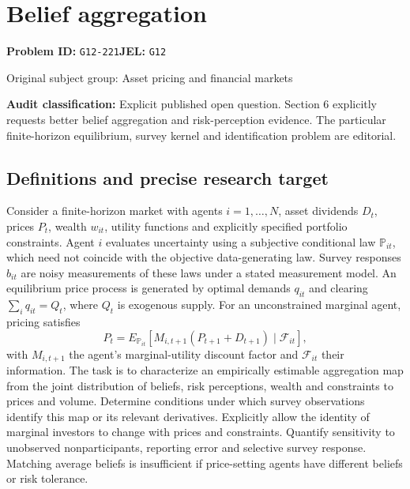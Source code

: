 \documentclass[11pt,a4paper]{article}
\begin{document}
\section*{Belief aggregation}
\textbf{Problem ID:} \texttt{G12-221}\quad \textbf{JEL:} \texttt{G12}\par
\label{problem:OP-0313}
{\sffamily\small\color{muted}Original subject group: Asset pricing and financial markets\par}
\label{definitions:problem:30007595}
\textbf{Audit classification:} Explicit published open question. Section 6 explicitly requests better belief aggregation and risk-perception evidence. The particular finite-horizon equilibrium, survey kernel and identification problem are editorial.
\subsection*{Definitions and precise research target}
Consider a finite-horizon market with agents \(i=1,\ldots,N\), asset dividends \(D_t\), prices \(P_t\), wealth \(w_{it}\), utility functions and explicitly specified portfolio constraints. Agent \(i\) evaluates uncertainty using a subjective conditional law \(\mathbb P_{it}\), which need not coincide with the objective data-generating law. Survey responses \(b_{it}\) are noisy measurements of these laws under a stated measurement model. An equilibrium price process is generated by optimal demands \(q_{it}\) and clearing \(\sum_iq_{it}=Q_t\), where \(Q_t\) is exogenous supply. For an unconstrained marginal agent, pricing satisfies
\[P_t=E_{\mathbb P_{it}}[M_{i,t+1}(P_{t+1}+D_{t+1})\mid\mathcal F_{it}],\]
with \(M_{i,t+1}\) the agent's marginal-utility discount factor and \(\mathcal F_{it}\) their information. The task is to characterize an empirically estimable aggregation map from the joint distribution of beliefs, risk perceptions, wealth and constraints to prices and volume. Determine conditions under which survey observations identify this map or its relevant derivatives. Explicitly allow the identity of marginal investors to change with prices and constraints. Quantify sensitivity to unobserved nonparticipants, reporting error and selective survey response. Matching average beliefs is insufficient if price-setting agents have different beliefs or risk tolerance.
\end{document}
